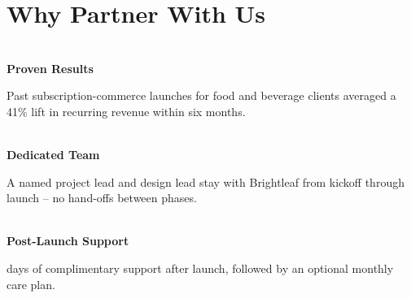 \section{Why Partner With Us}

\noindent
\begin{minipage}[t]{0.315\linewidth}
  \begin{tcolorbox}[statbox]
    \centering{\Large\color{accent2}\faChartBar}\\[4pt]
    \textbf{\color{accent}Proven Results}\\[3pt]
    {\small\color{softgray}\raggedright\justifying
    Past subscription-commerce launches for food and beverage clients averaged a 41\% lift in
    recurring revenue within six months.}
  \end{tcolorbox}
\end{minipage}\hfill
\begin{minipage}[t]{0.315\linewidth}
  \begin{tcolorbox}[statbox]
    \centering{\Large\color{accent2}\faUsers}\\[4pt]
    \textbf{\color{accent}Dedicated Team}\\[3pt]
    {\small\color{softgray}\raggedright\justifying
    A named project lead and design lead stay with Brightleaf from kickoff through launch --
    no hand-offs between phases.}
  \end{tcolorbox}
\end{minipage}\hfill
\begin{minipage}[t]{0.315\linewidth}
  \begin{tcolorbox}[statbox]
    \centering{\Large\color{accent2}\faLifeRing}\\[4pt]
    \textbf{\color{accent}Post-Launch Support}\\[3pt]
    {\small\color{softgray}\raggedright{} days of complimentary support after launch, followed by an optional monthly care plan.}
  \end{tcolorbox}
\end{minipage}
